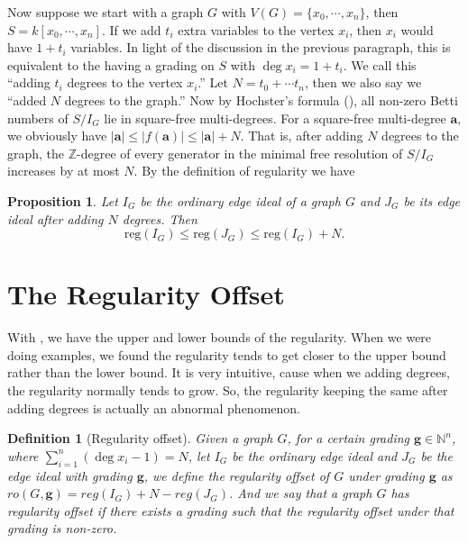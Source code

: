 \documentclass[dvipsnames,10pt]{article}
\newtheorem{proposition}[theorem]{Proposition}
\newtheorem{defi}[theorem]{Definition}
\begin{document}
Now suppose we start with a graph $G$ with $V(G)=\{x_0,\cdots,x_n\}$, then $S=k[x_0,\cdots,x_n]$. If we add $t_i$ extra variables to the vertex $x_i$, then $x_i$ would have $1+t_i$ variables. In light of the discussion in the previous paragraph, this is equivalent to the having a grading on $S$ with $\deg x_i=1+t_i$. We call this ``adding $t_i$ degrees to the vertex $x_i$.'' Let $N=t_0+\cdots t_n$, then we also say we ``added $N$ degrees to the graph.'' Now by Hochster's formula (), all non-zero Betti numbers of $S/I_G$ lie in square-free multi-degrees. For a square-free multi-degree $\mathbf{a}$, we obviously have $|\mathbf{a}|\leqslant|f(\mathbf{a})| \leqslant |\mathbf{a}| + N$. That is, after adding $N$ degrees to the graph, the $\mathbb{Z}$-degree of every generator in the minimal free resolution of $S/I_G$ increases by at most $N$. By the definition of regularity we have

\begin{proposition}
    Let $I_G$ be the ordinary edge ideal of a graph $G$ and $J_G$ be its edge ideal after adding $N$ degrees. Then
    \begin{equation*}
        \mathrm{reg}(I_G) \leqslant \mathrm{reg} (J_G) \leqslant \mathrm{reg} (I_G)+N.
    \end{equation*}
\end{proposition}

\section{The Regularity Offset}

With , we have the upper and lower bounds of the regularity. When we were doing examples, we found the regularity tends to get closer to the upper bound rather than the lower bound. It is very intuitive, cause when we adding degrees, the regularity normally tends to grow. So, the regularity keeping the same after adding degrees is actually an abnormal phenomenon.

\begin{defi}[Regularity offset]
   Given a graph $G$, for a certain grading $\mathbf{g}\in\mathbb{N}^n$, where $\sum_{i=1}^{n} (\deg x_i-1)=N$, let $I_G$ be the ordinary edge ideal and $J_G$ be the edge ideal with grading $\mathbf{g}$, we define the regularity offset of $G$ under grading $\mathbf{g}$ as $ro(G,\mathbf{g})=reg(I_G)+N-reg(J_G)$. And we say that a graph $G$ has regularity offset if there exists a grading such that the regularity offset under that grading is non-zero.
   
\end{defi}
\end{document}
